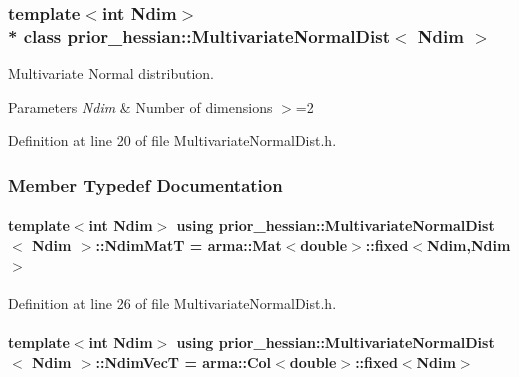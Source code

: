 \subsubsection*{template$<$int Ndim$>$\\*
class prior\+\_\+hessian\+::\+Multivariate\+Normal\+Dist$<$ Ndim $>$}

Multivariate Normal distribution. 


\begin{DoxyParams}{Parameters}
{\em Ndim} & Number of dimensions $>$=2 \\
\hline
\end{DoxyParams}


Definition at line 20 of file Multivariate\+Normal\+Dist.\+h.



\subsubsection{Member Typedef Documentation}
\paragraph[{\texorpdfstring{Ndim\+MatT}{NdimMatT}}]{\setlength{\rightskip}{0pt plus 5cm}template$<$int Ndim$>$ using {\bf prior\+\_\+hessian\+::\+Multivariate\+Normal\+Dist}$<$ Ndim $>$\+::{\bf Ndim\+MatT} =  arma\+::\+Mat$<$double$>$\+::fixed$<$Ndim,Ndim$>$}\hypertarget{classprior__hessian_1_1MultivariateNormalDist_a2aa1e12ff8819a2cc3a8d3f33bcf8de2}{}\label{classprior__hessian_1_1MultivariateNormalDist_a2aa1e12ff8819a2cc3a8d3f33bcf8de2}


Definition at line 26 of file Multivariate\+Normal\+Dist.\+h.

\paragraph[{\texorpdfstring{Ndim\+VecT}{NdimVecT}}]{\setlength{\rightskip}{0pt plus 5cm}template$<$int Ndim$>$ using {\bf prior\+\_\+hessian\+::\+Multivariate\+Normal\+Dist}$<$ Ndim $>$\+::{\bf Ndim\+VecT} =  arma\+::\+Col$<$double$>$\+::fixed$<$Ndim$>$}\hypertarget{classprior__hessian_1_1MultivariateNormalDist_a0f5725cbbfa47be45b2741467dcd5615}{}\label{classprior__hessian_1_1MultivariateNormalDist_a0f5725cbbfa47be45b2741467dcd5615}


